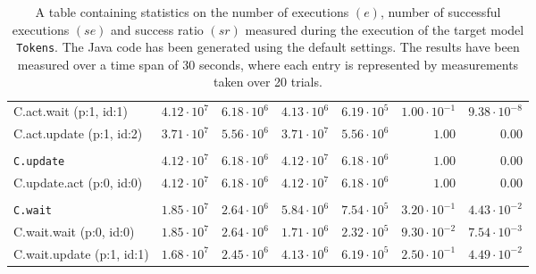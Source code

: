 \begin{table}[htbp]
{\begin{tabular}{lrrrrrr}
\hspace{3mm}C.act.wait (p:1, id:1)    & $4.12 \cdot 10^{7}$ & $6.18 \cdot 10^{6}$ & $4.13 \cdot 10^{6}$ & $6.19 \cdot 10^{5}$ & $1.00 \cdot 10^{-1}$ & $9.38 \cdot 10^{-8}$ \\
\hspace{3mm}C.act.update (p:1, id:2)  & $3.71 \cdot 10^{7}$ & $5.56 \cdot 10^{6}$ & $3.71 \cdot 10^{7}$ & $5.56 \cdot 10^{6}$ &               $1.00$ &               $0.00$ \\
\\[-8pt]\texttt{C.update}             & $4.12 \cdot 10^{7}$ & $6.18 \cdot 10^{6}$ & $4.12 \cdot 10^{7}$ & $6.18 \cdot 10^{6}$ &               $1.00$ &               $0.00$ \\
\hspace{3mm}C.update.act (p:0, id:0)  & $4.12 \cdot 10^{7}$ & $6.18 \cdot 10^{6}$ & $4.12 \cdot 10^{7}$ & $6.18 \cdot 10^{6}$ &               $1.00$ &               $0.00$ \\
\\[-8pt]\texttt{C.wait}               & $1.85 \cdot 10^{7}$ & $2.64 \cdot 10^{6}$ & $5.84 \cdot 10^{6}$ & $7.54 \cdot 10^{5}$ & $3.20 \cdot 10^{-1}$ & $4.43 \cdot 10^{-2}$ \\
\hspace{3mm}C.wait.wait (p:0, id:0)   & $1.85 \cdot 10^{7}$ & $2.64 \cdot 10^{6}$ & $1.71 \cdot 10^{6}$ & $2.32 \cdot 10^{5}$ & $9.30 \cdot 10^{-2}$ & $7.54 \cdot 10^{-3}$ \\
\hspace{3mm}C.wait.update (p:1, id:1) & $1.68 \cdot 10^{7}$ & $2.45 \cdot 10^{6}$ & $4.13 \cdot 10^{6}$ & $6.19 \cdot 10^{5}$ & $2.50 \cdot 10^{-1}$ & $4.49 \cdot 10^{-2}$ \\
\bottomrule
\end{tabular}
}
\caption{A table containing statistics on the number of executions $(e)$, number of successful executions $(se)$ and success ratio $(sr)$ measured during the execution of the target model \texttt{Tokens}. The Java code has been generated using the default settings. The results have been measured over a time span of 30 seconds, where each entry is represented by measurements taken over 20 trials.}
\label{table:frequency_results_tokens_default}
\end{table}